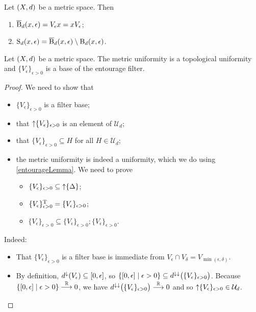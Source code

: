 \begin{lemma}
Let $\left( X,d \right)$ be a metric space. Then
\begin{enumerate}
\item $\operatorname{\overline{B}}_d(x,\epsilon) = V_\epsilon x = xV_\epsilon$;
\item $\operatorname{S}_d(x,\epsilon) = \operatorname{\overline{B}}_d(x,\epsilon)\setminus \operatorname{B}_d(x,\epsilon)$.
\end{enumerate}
\end{lemma}

\begin{lemma}
Let $\left( X,d \right)$ be a metric space. The metric uniformity is a topological uniformity and $\{V_\epsilon\}_{\epsilon>0}$ is a base of the entourage filter.
\end{lemma}
\begin{proof}
We need to show that
\begin{itemize}
\item $\{V_\epsilon\}_{\epsilon>0}$ is a filter base;
\item that $\operatorname{\uparrow}\{V_\epsilon\}_{\epsilon>0}$ is an element of $\mathcal{U}_d$;
\item that $\{V_\epsilon\}_{\epsilon>0}\subseteq H$ for all $H\in \mathcal{U}_d$;
\item the metric uniformity is indeed a uniformity, which we do using \ref{entourageLemma}. We need to prove
\begin{itemize}
\item $\{V_\epsilon\}_{\epsilon>0}\subseteq\operatorname{\uparrow}\{\Delta\}$;
\item $\{V_\epsilon\}_{\epsilon>0}^{\mathrm{T}} = \{V_\epsilon\}_{\epsilon>0}$;
\item $\{V_\epsilon\}_{\epsilon>0} \subseteq \{V_\epsilon\}_{\epsilon>0}; \{V_\epsilon\}_{\epsilon>0}$.
\end{itemize}
\end{itemize}
Indeed:
\begin{itemize}
\item That $\{V_\epsilon\}_{\epsilon>0}$ is a filter base is immediate from $V_\epsilon \cap V_\delta = V_{\min(\epsilon, \delta)}$.
\item By definition, $d^{\imf}(V_\epsilon) \subseteq \interval{0,\epsilon}$, so $\setbuilder{\interval{0,\epsilon}}{\epsilon>0} \subseteq d^{\imf\imf}\big(\{V_\epsilon\}_{\epsilon>0}\big)$. Because $\setbuilder{\interval{0,\epsilon}}{\epsilon>0} \overset{\R}{\longrightarrow} 0$, we have $d^{\downarrow\downarrow}\big(\{V_\epsilon\}_{\epsilon>0}\big) \overset{\mathbb{R}}{\longrightarrow} 0$ and so $\operatorname{\uparrow}\{V_\epsilon\}_{\epsilon>0} \in \mathcal{U}_d$.

\end{itemize}
\end{proof}
